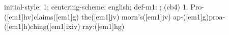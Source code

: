 initial-style: 1;
centering-scheme: english;
def-m1: \grealign;
(cb4) 1. Pro-([em1]hv)claims([em1]g) the([em1]jv) morn's([em1]jv) ap-([em1]g)proa-([em1]h)ching([em1]ixiv) ray:([em1]hg)